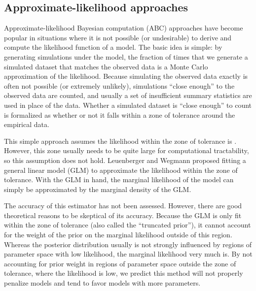 \subsection{Approximate-likelihood approaches}

Approximate-likelihood Bayesian computation (ABC) approaches
\citep{Tavare1997,Beaumont2002} have become popular in situations where it is
not possible (or undesirable) to derive and compute the likelihood function of
a model.
The basic idea is simple: by generating simulations under the model, the
fraction of times that we generate a simulated dataset that matches the
observed data is a Monte Carlo approximation of the likelihood.
Because simulating the observed data exactly is often not possible (or extremely
unlikely), simulations ``close enough'' to the observed data are
counted, and usually a set of insufficient summary statistics are used in place
of the data.
Whether a simulated dataset is ``close enough'' to count is formalized as
whether or not it falls within a zone of tolerance around the empirical data.

This simple approach assumes the likelihood within the zone of tolerance is
.
However, this zone usually needs to be quite large for computational
tractability, so this assumption does not hold.
Leuenberger and Wegmann \citep{Leuenberger2010} proposed fitting a general
linear model (GLM) to approximate the likelihood within the zone of tolerance.
With the GLM in hand, the marginal likelihood of the model can simply be
approximated by the marginal density of the GLM.

The accuracy of this estimator has not been assessed.
However, there are good theoretical reasons to be skeptical of its accuracy.
Because the GLM is only fit within the zone of tolerance (also called the
``truncated prior''), it cannot account for the weight of the prior on the
marginal likelihood outside of this region.
Whereas the posterior distribution usually is not strongly influenced by
regions of parameter space with low likelihood, the marginal likelihood very
much is.
By not accounting for prior weight in regions of parameter space outside the
zone of tolerance, where the likelihood is low, we predict this method will not
properly penalize models and tend to favor models with more parameters.

